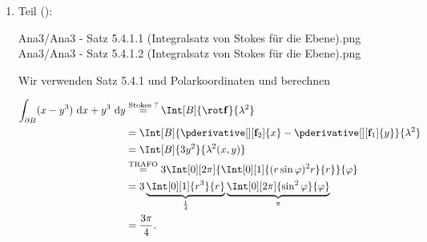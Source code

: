 \begin{solution}
\begin{enumerate}[label = \arabic*.]
    \item Teil ():
    
    {Ana3/Ana3 - Satz 5.4.1.1 (Integralsatz von Stokes für die Ebene).png}
    {Ana3/Ana3 - Satz 5.4.1.2 (Integralsatz von Stokes für die Ebene).png}

    Wir verwenden Satz 5.4.1 und Polarkoordinaten und berechnen

    \begin{align*}
        \int_{\partial B}
                (x - y^3)
                ~\mathrm d x
            +
            y^3
            ~\mathrm d y
        & \stackrel
        {
            \text{Stokes ?}
        }{=}
        \Int[B]
        {
            \rot \mathbf f
        }{\lambda^2} \\
        & =
        \Int[B]
        {
            \pderivative[][\mathbf f_2]{x}
            -
            \pderivative[][\mathbf f_1]{y}
        }{\lambda^2} \\
        & =
        \Int[B]
        {
            3 y^2
        }{\lambda^2(x, y)} \\
        & \stackrel
        {
            \text{TRAFO}
        }{=}
        3
        \Int[0][2 \pi]
        {
            \Int[0][1]
            {
                (r \sin \varphi)^2 r
            }{r}
        }{\varphi} \\
        & =
        3
        \underbrace
        {
            \Int[0][1]
            {
                r^3
            }{r}
        }_\frac{1}{4}
        \underbrace
        {
            \Int[0][2 \pi]
            {
                \sin^2 \varphi
            }{\varphi}
        }_\pi \\
        & =
        \frac{3 \pi}{4}.
    \end{align*}

\end{enumerate}

\end{solution}

